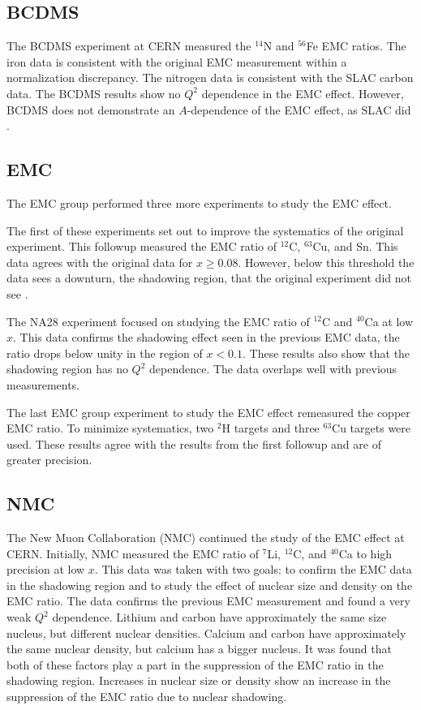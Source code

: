 
\subsection{BCDMS}
The BCDMS experiment at CERN measured the $^{14}$N and $^{56}$Fe EMC ratios. The iron data is consistent with the original EMC measurement within a normalization discrepancy. The nitrogen data is consistent with the SLAC carbon data. The BCDMS results show no $Q^2$ dependence in the EMC effect. However, BCDMS does not demonstrate an $A$-dependence of the EMC effect, as SLAC did \cite{Norton}. %

\subsection{EMC} 
The EMC group performed three more experiments to study the EMC effect.

The first of these experiments set out to improve the systematics of the original experiment. This followup measured the EMC ratio of $^{12}$C, $^{63}$Cu, and Sn. This data agrees with the original data for $x \geq 0.08$. However, below this threshold the data sees a downturn, the shadowing region, that the original experiment did not see \cite{ashmanEMC}.

The NA28 experiment focused on studying the EMC ratio of $^{12}$C and $^{40}$Ca at low $x$. This data confirms the shadowing effect seen in the previous EMC data, the ratio drops below unity in the region of $x<0.1$. These results also show that the shadowing region has no $Q^2$ dependence. The data overlaps well with previous measurements.

The last EMC group experiment to study the EMC effect remeasured the copper EMC ratio. To minimize systematics, two $^2$H targets and three $^{63}$Cu targets were used. These results agree with the results from the first followup and are of greater precision. %

\subsection{NMC}
The New Muon Collaboration (NMC) continued the study of the EMC effect at CERN. Initially, NMC measured the EMC ratio of $^7$Li, $^{12}$C, and $^{40}$Ca to high precision at low $x$. This data was taken with two goals: to confirm the EMC data in the shadowing region and to study the effect of nuclear size and density on the EMC ratio. The data confirms the previous EMC measurement and found a very weak $Q^2$ dependence. Lithium and carbon have approximately the same size nucleus, but different nuclear densities. Calcium and carbon have approximately the same nuclear density, but calcium has a bigger nucleus. It was found that both of these factors play a part in the suppression of the EMC ratio in the shadowing region. Increases in nuclear size or density show an increase in the suppression of the EMC ratio due to nuclear shadowing.

